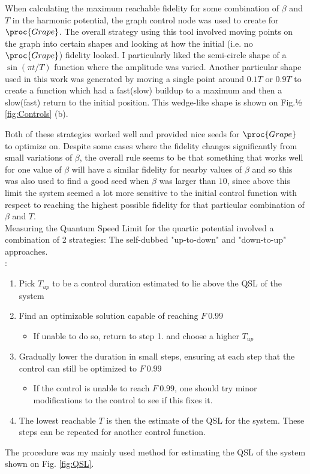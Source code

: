 \documentclass[aps,pra,reprint,superscriptaddress]{revtex4-1}
\begin{document}
When calculating the maximum reachable fidelity for some combination of $\beta$ and $T$ in the harmonic potential, the graph control node was used to create for $\proc{Grape}$. The overall strategy using this tool involved moving points on the graph into certain shapes and looking at how the initial (i.e. no $\proc{Grape}$) fidelity looked. I particularly liked the semi-circle shape of a $\sin(\pi t/T)$ function where the amplitude was varied. Another particular shape used in this work was generated by moving a single point around $0.1T$ or $0.9T$ to create a function which had a fast(slow) buildup to a maximum and then a slow(fast) return to the initial position. This wedge-like shape is shown on Fig.½ \ref{fig:Controls} (b).

Both of these strategies worked well and provided nice seeds for $\proc{Grape}$ to optimize on. Despite some cases where the fidelity changes significantly from small variations of $\beta$, the overall rule seems to be that something that works well for one value of $\beta$ will have a similar fidelity for nearby values of $\beta$ and so this was also used to find a good seed when $\beta$ was larger than $10$, since above this limit the system seemed a lot more sensitive to the initial control function with respect to reaching the highest possible fidelity for that particular combination of $\beta$ and $T$. \\

Measuring the Quantum Speed Limit for the quartic potential involved a combination of 2 strategies: The self-dubbed "up-to-down" and "down-to-up" approaches. \\

:
\begin{enumerate}
	\item Pick $T_{up}$ to be a control duration estimated to lie above the QSL of the system
	\item Find an optimizable solution capable of reaching $F~0.99$
	\begin{itemize}
		\item If unable to do so, return to step 1. and choose a higher $T_{up}$
	\end{itemize}
	\item Gradually lower the duration in small steps, ensuring at each step that the control can still be optimized to $F~0.99$
	\begin{itemize}
		\item If the control is unable to reach $F~0.99$, one should try minor modifications to the control to see if this fixes it.
	\end{itemize}
	\item The lowest reachable $T$ is then the estimate of the QSL for the system. These steps can be repeated for another control function.
\end{enumerate}
The  procedure was my mainly used method for estimating the QSL of the system shown on Fig. \ref{fig:QSL}.\\
\end{document}
